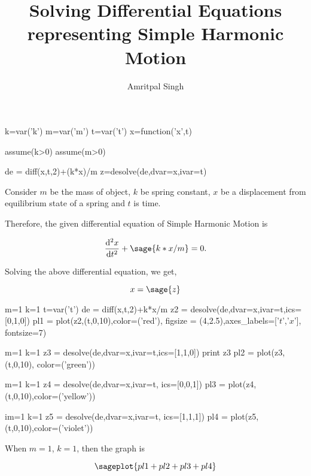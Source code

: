\documentclass{article}
\title{Solving Differential Equations representing Simple Harmonic Motion}
\author{Amritpal Singh}
\begin{document}
\maketitle

\begin{sagesilent}
k=var('k')
m=var('m')
t=var('t')
x=function('x',t)

assume(k>0)
assume(m>0)

de = diff(x,t,2)+(k*x)/m
z=desolve(de,dvar=x,ivar=t)
\end{sagesilent}
Consider $m$ be the mass of object, $k$ be spring constant, $x$ be a displacement from equilibrium state of a spring and $t$ is time. 

Therefore, the given differential equation of Simple Harmonic Motion is  

\begin{comment}
\begin{sagesilent}
F=var('F') 
a=var('a')
\end{sagesilent}

\[
 \sage{F==m*a} --1 \\ 
 \sage{F==-k*x} --2
\]
\end{comment}

\[
  \frac{\mathrm{d}^{2}x}{\mathrm{d}t^{2}} +  \sage{k*x/m} = 0.
\]


Solving the above differential equation, we get,

$$x = \sage{z}$$












\begin{sagesilent}
m=1
k=1
t=var('t')
de = diff(x,t,2)+k*x/m
z2 = desolve(de,dvar=x,ivar=t,ics=[0,1,0])
pl1 = plot(z2,(t,0,10),color=('red'), figsize = (4,2.5),axes_labels=['$t$','$x$'], fontsize=7)

m=1
k=1
z3 = desolve(de,dvar=x,ivar=t,ics=[1,1,0])
print z3
pl2 = plot(z3,(t,0,10), color=('green'))

m=1
k=1
z4 = desolve(de,dvar=x,ivar=t, ics=[0,0,1])
pl3 = plot(z4,(t,0,10),color=('yellow'))

im=1
k=1
z5 = desolve(de,dvar=x,ivar=t, ics=[1,1,1])
pl4 = plot(z5,(t,0,10),color=('violet'))
\end{sagesilent}


When $m=1$, $k=1$, then the graph is

$$\sageplot{pl1+pl2+pl3+pl4}$$
\end{document}
